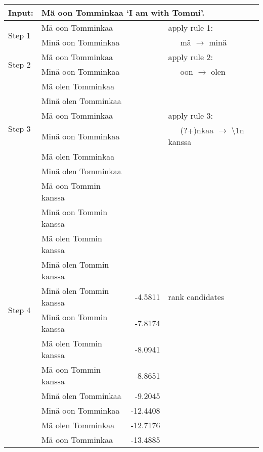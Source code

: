 \documentclass[11pt]{article}
\begin{document}
\begin{table*}
\vspace{-29pt}
  \centering
  \begin{tabular}{|l|l|r|l|}
    \hline
    \textbf{Input:} & \multicolumn{3}{l|}{M\"{a} oon Tomminkaa `I am with Tommi'.} \\
    \hline
    \multirow{2}{*}{Step 1}  & M\"{a} oon Tomminkaa & & apply rule 1: \\
                             & Min\"{a} oon Tomminkaa & & ~~~m\"{a} $\rightarrow$ min\"{a} \\
    \hline
    \multirow{2}{*}{Step 2}  & M\"{a} oon Tomminkaa & & apply rule 2: \\
                             & Min\"{a} oon Tomminkaa & & ~~~oon $\rightarrow$ olen \\
                             & M\"{a} olen Tomminkaa & & \\
                             & Min\"{a} olen Tomminkaa & & \\
    \hline
    \multirow{2}{*}{Step 3}  & M\"{a} oon Tomminkaa   & & apply rule 3:\\
                             & Min\"{a} oon Tomminkaa &  & ~~~(?+)nkaa $\rightarrow$ \textbackslash1n kanssa \\
                             & M\"{a} olen Tomminkaa  & &\\
                             & Min\"{a} olen Tomminkaa  & &\\
                             & M\"{a} oon Tommin kanssa  & &\\
                             & Min\"{a} oon Tommin kanssa  & &\\
                             & M\"{a} olen Tommin kanssa  & &\\
                             & Min\"{a} olen Tommin kanssa  & &\\
    \hline
    \multirow{2}{*}{Step 4} &  Min\"{a} olen Tommin kanssa & -4.5811 & rank candidates \\
                            &  Min\"{a} oon Tommin kanssa & -7.8174 & \\
                            &  M\"{a} olen Tommin kanssa & -8.0941 & \\
                            &  M\"{a} oon Tommin kanssa & -8.8651 & \\
                            &  Min\"{a} olen Tomminkaa & -9.2045 & \\
                            &  Min\"{a} oon Tomminkaa & -12.4408 & \\
                            &  M\"{a} olen Tomminkaa & -12.7176 & \\
                            &  M\"{a} oon Tomminkaa & -13.4885 & \\


\end{tabular}
\end{table*}
\end{document}
